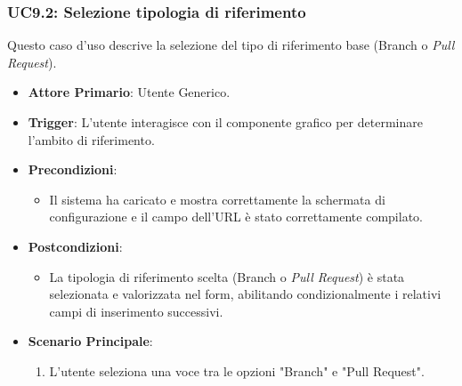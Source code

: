 \documentclass[12pt, a4paper]{article}
\begin{document}
\subsubsection{UC9.2: Selezione tipologia di riferimento}\label{uc:9.2}
Questo caso d'uso descrive la selezione del tipo di riferimento base (Branch o \textit{Pull Request}).
\begin{itemize}
    \item \textbf{Attore Primario}: Utente Generico.
    \item \textbf{Trigger}: L'utente interagisce con il componente grafico per determinare l'ambito di riferimento.
    \item \textbf{Precondizioni}:\begin{itemize}\item Il sistema ha caricato e mostra correttamente la schermata di configurazione e il campo dell'URL è stato correttamente compilato.\end{itemize}
    \item \textbf{Postcondizioni}:\begin{itemize}\item La tipologia di riferimento scelta (Branch o \textit{Pull Request}) è stata selezionata e valorizzata nel form, abilitando condizionalmente i relativi campi di inserimento successivi.\end{itemize}
    \item \textbf{Scenario Principale}:
    \begin{enumerate}
        \item L'utente seleziona una voce tra le opzioni "Branch" e "Pull Request".
    \end{enumerate}
\end{itemize}
\end{document}
